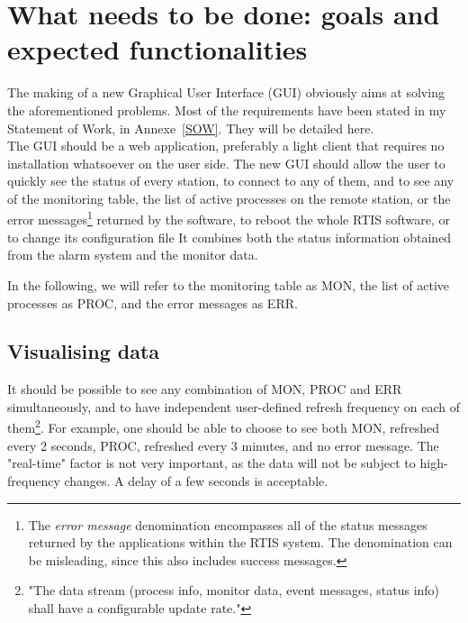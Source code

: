 \documentclass{themeensg}
\begin{document}

\section{What needs to be done: goals and expected functionalities}

The making of a new Graphical User Interface (GUI) obviously aims at solving the aforementioned problems. Most of the requirements have been stated in my Statement of Work, in Annexe~\ref{SOW}. They will be detailed here. \\


The GUI should be a web application, preferably a light client that requires no installation whatsoever on the user side. The new GUI should allow the user to quickly see the status of every station, to connect to any of them, and to see any of the monitoring table, the list of active processes on the remote station, or the error messages\footnote{The \textit{error message} denomination encompasses all of the status messages returned by the applications within the RTIS system. The denomination can be misleading, since this also includes success messages.} returned by the software, to reboot the whole RTIS software, or to change its configuration file It combines both the status information obtained from the alarm system and the monitor data. 

In the following, we will refer to the monitoring table as MON, the list of active processes as PROC, and the error messages as ERR.\\

\subsection{Visualising data}

It should be possible to see any combination of MON, PROC and ERR simultaneously, and to have independent user-defined refresh frequency on each of them\footnote{"The data stream (process info, monitor data, event messages, status info) shall have a configurable update rate."}. For example, one should be able to choose to see both MON, refreshed every 2 seconds, PROC, refreshed every 3 minutes, and no error message. The "real-time" factor is not very important, as the data will not be subject to high-frequency changes. A delay of a few seconds is acceptable.\\
\end{document}
